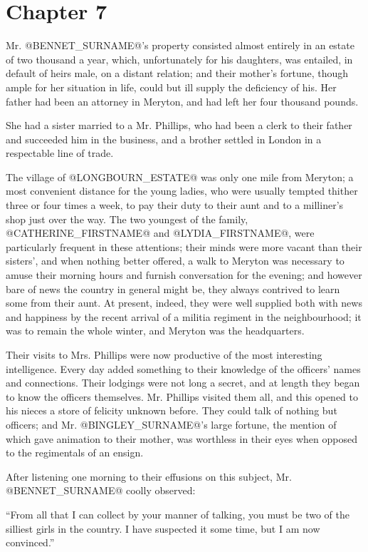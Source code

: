 \chapter*{Chapter 7}


Mr. @BENNET_SURNAME@'s property consisted almost entirely in an estate of two
thousand a year, which, unfortunately for his daughters, was entailed,
in default of heirs male, on a distant relation; and their mother's
fortune, though ample for her situation in life, could but ill supply
the deficiency of his. Her father had been an attorney in Meryton, and
had left her four thousand pounds.

She had a sister married to a Mr. Phillips, who had been a clerk to
their father and succeeded him in the business, and a brother settled in
London in a respectable line of trade.

The village of @LONGBOURN_ESTATE@ was only one mile from Meryton; a most
convenient distance for the young ladies, who were usually tempted
thither three or four times a week, to pay their duty to their aunt and
to a milliner's shop just over the way. The two youngest of the family,
@CATHERINE_FIRSTNAME@ and @LYDIA_FIRSTNAME@, were particularly frequent in these attentions;
their minds were more vacant than their sisters', and when nothing
better offered, a walk to Meryton was necessary to amuse their morning
hours and furnish conversation for the evening; and however bare of news
the country in general might be, they always contrived to learn some
from their aunt. At present, indeed, they were well supplied both with
news and happiness by the recent arrival of a militia regiment in the
neighbourhood; it was to remain the whole winter, and Meryton was the
headquarters.

Their visits to Mrs. Phillips were now productive of the most
interesting intelligence. Every day added something to their knowledge
of the officers' names and connections. Their lodgings were not long a
secret, and at length they began to know the officers themselves. Mr.
Phillips visited them all, and this opened to his nieces a store of
felicity unknown before. They could talk of nothing but officers; and
Mr. @BINGLEY_SURNAME@'s large fortune, the mention of which gave animation
to their mother, was worthless in their eyes when opposed to the
regimentals of an ensign.

After listening one morning to their effusions on this subject, Mr.
@BENNET_SURNAME@ coolly observed:

``From all that I can collect by your manner of talking, you must be two
of the silliest girls in the country. I have suspected it some time, but
I am now convinced.''


